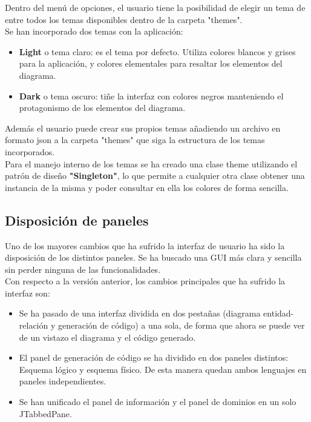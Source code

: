 Dentro del menú de opciones, el usuario tiene la posibilidad de elegir un tema de entre todos los temas disponibles dentro de la carpeta "themes".\\

Se han incorporado dos temas con la aplicación:
\begin{itemize}
    \item \textbf{Light} o tema claro: es el tema por defecto. Utiliza colores blancos y grises para la aplicación, y colores elementales para resaltar los elementos del diagrama.
    \item \textbf{Dark} o tema oscuro: tiñe la interfaz con colores negros manteniendo el protagonismo de los elementos del diagrama.
\end{itemize}

Además el usuario puede crear sus propios temas añadiendo un archivo en formato json a la carpeta "themes" que siga la estructura de los temas incorporados.\\

Para el manejo interno de los temas se ha creado una clase theme utilizando el patrón de diseño \textbf{"Singleton"}\cite{singleton}, lo que permite a cualquier otra clase obtener una instancia de la misma y poder consultar en ella los colores de forma sencilla.

\subsection{Disposición de paneles}
Uno de los mayores cambios que ha sufrido la interfaz de usuario ha sido la disposición de los distintos paneles. Se ha buscado una GUI más clara y sencilla sin perder ninguna de las funcionalidades.\\

Con respecto a la versión anterior, los cambios principales que ha sufrido la interfaz son:
\begin{itemize}
    \item Se ha pasado de una interfaz dividida en dos pestañas (diagrama entidad-relación y generación de código) a una sola, de forma que ahora se puede ver de un vistazo el diagrama y el código generado.
    \item El panel de generación de código se ha dividido en dos paneles distintos: Esquema lógico y esquema físico. De esta manera quedan ambos lenguajes en paneles independientes.
    \item Se han unificado el panel de información y el panel de dominios en un solo JTabbedPane.
\end{itemize}
